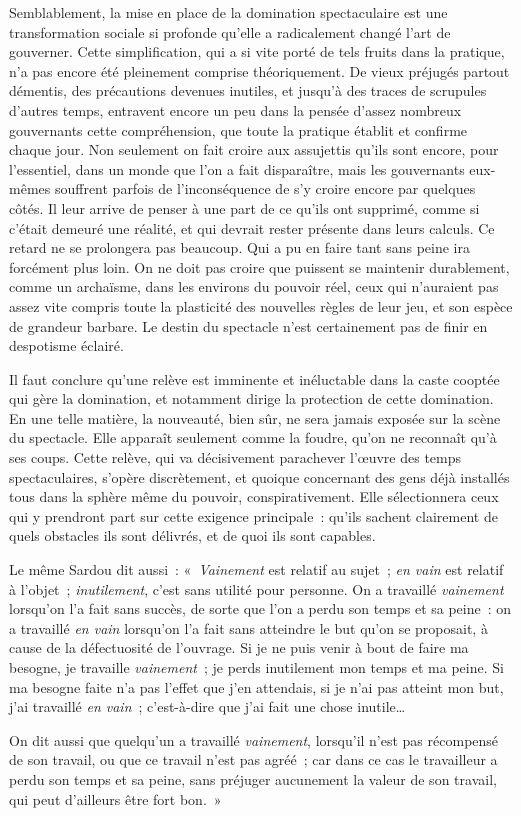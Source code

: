 \documentclass[french,twoside]{book} %
\def\bignobreak{\ifdim\lastskip<\bigskipamount
  \removelastskip\nopagebreak\bigskip\fi}
\newcommand{\labelblock}[1]{\bigbreak{\color{rubric}\noindent\textbf{#1}\par}\bignobreak}
\begin{document}
Semblablement, la mise en place de la domination spectaculaire est une transformation sociale si profonde qu’elle a radicalement changé l’art de gouverner. Cette simplification, qui a si vite porté de tels fruits dans la pratique, n’a pas encore été pleinement comprise théoriquement. De vieux préjugés partout démentis, des précautions devenues inutiles, et jusqu’à des traces de scrupules d’autres temps, entravent encore un peu dans la pensée d’assez nombreux gouvernants cette compréhension, que toute la pratique établit et confirme chaque jour. Non seulement on fait croire aux assujettis qu’ils sont encore, pour l’essentiel, dans un monde que l’on a fait disparaître, mais les gouvernants eux-mêmes souffrent parfois de l’inconséquence de s’y croire encore par quelques côtés. Il leur arrive de penser à une part de ce qu’ils ont supprimé, comme si c’était demeuré une réalité, et qui devrait rester présente dans leurs calculs. Ce retard ne se prolongera pas beaucoup. Qui a pu en faire tant sans peine ira forcément plus loin. On ne doit pas croire que puissent se maintenir durablement, comme un archaïsme, dans les environs du pouvoir réel, ceux qui n’auraient pas assez vite compris toute la plasticité des nouvelles règles de leur jeu, et son espèce de grandeur barbare. Le destin du spectacle n’est certainement pas de finir en despotisme éclairé.\par
Il faut conclure qu’une relève est imminente et inéluctable dans la caste cooptée qui gère la domination, et notamment dirige la protection de cette domination. En une telle matière, la nouveauté, bien sûr, ne sera jamais exposée sur la scène du spectacle. Elle apparaît seulement comme la foudre, qu’on ne reconnaît qu’à ses coups. Cette relève, qui va décisivement parachever l’œuvre des temps spectaculaires, s’opère discrètement, et quoique concernant des gens déjà installés tous dans la sphère même du pouvoir, conspirativement. Elle sélectionnera ceux qui y prendront part sur cette exigence principale : qu’ils sachent clairement de quels obstacles ils sont délivrés, et de quoi ils sont capables.\par

\labelblock{XXXIII}

\noindent Le même Sardou dit aussi : « \emph{Vainement} est relatif au sujet ; \emph{en vain} est relatif à l’objet ; \emph{inutilement}, c’est sans utilité pour personne. On a travaillé \emph{vainement} lorsqu’on l’a fait sans succès, de sorte que l’on a perdu son temps et sa peine : on a travaillé \emph{en vain} lorsqu’on l’a fait sans atteindre le but qu’on se proposait, à cause de la défectuosité de l’ouvrage. Si je ne puis venir à bout de faire ma besogne, je travaille \emph{vainement} ; je perds inutilement mon temps et ma peine. Si ma besogne faite n’a pas l’effet que j’en attendais, si je n’ai pas atteint mon but, j’ai travaillé \emph{en vain} ; c’est-à-dire que j’ai fait une chose inutile…\par
On dit aussi que quelqu’un a travaillé \emph{vainement}, lorsqu’il n’est pas récompensé de son travail, ou que ce travail n’est pas agréé ; car dans ce cas le travailleur a perdu son temps et sa peine, sans préjuger aucunement la valeur de son travail, qui peut d’ailleurs être fort bon. »\par
\end{document}
